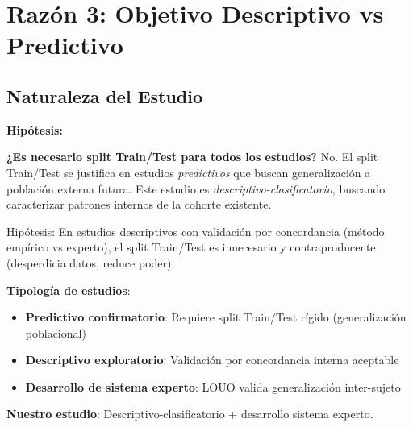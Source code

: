 \documentclass[12pt,letterpaper,twoside]{report}
\begin{document}
\section{Razón 3: Objetivo Descriptivo vs Predictivo}

\subsection{Naturaleza del Estudio}

\begin{hipotesisbox}
\textbf{Hipótesis:}

\textbf{¿Es necesario split Train/Test para todos los estudios?} No. El split Train/Test se justifica en estudios \textit{predictivos} que buscan generalización a población externa futura. Este estudio es \textit{descriptivo-clasificatorio}, buscando caracterizar patrones internos de la cohorte existente.

Hipótesis: En estudios descriptivos con validación por concordancia (método empírico vs experto), el split Train/Test es innecesario y contraproducente (desperdicia datos, reduce poder).
\end{hipotesisbox}

\begin{estadisticobox}
\textbf{Tipología de estudios}:

\begin{itemize}[noitemsep]
    \item \textbf{Predictivo confirmatorio}: Requiere split Train/Test rígido (generalización poblacional)
    \item \textbf{Descriptivo exploratorio}: Validación por concordancia interna aceptable
    \item \textbf{Desarrollo de sistema experto}: LOUO valida generalización inter-sujeto
\end{itemize}

\textbf{Nuestro estudio}: Descriptivo-clasificatorio + desarrollo sistema experto.
\end{estadisticobox}
\end{document}
